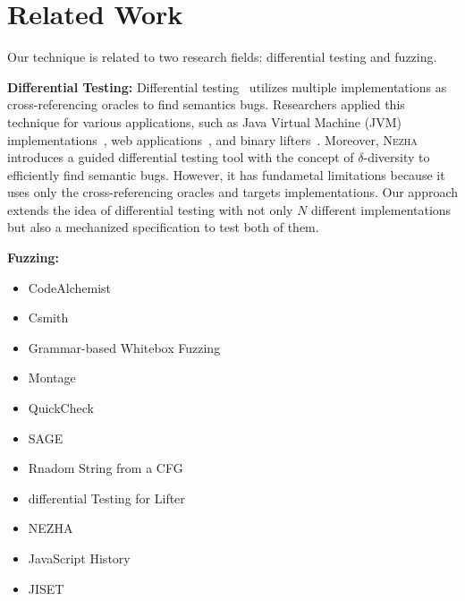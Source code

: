 \section{Related Work}\label{sec:related}

Our technique is related to two research fields: differential testing and
fuzzing.

\textbf{Differential Testing:} Differential testing~\cite{???} utilizes multiple
implementations as cross-referencing oracles to find semantics bugs.
Researchers applied this technique for various applications, such as Java
Virtual Machine (JVM) implementations~\cite{???}, web applications~\cite{???},
and binary lifters~\cite{ir-diff-test}.  Moreover, \textsc{Nezha} introduces a
guided differential testing tool with the concept of $\delta$-diversity to
efficiently find semantic bugs.  However, it has fundametal limitations because
it uses only the cross-referencing oracles and targets implementations.  Our
approach extends the idea of differential testing with not only $N$ different
implementations but also a mechanized specification to test both of them.

\textbf{Fuzzing:} 

\begin{itemize}


  \item CodeAlchemist\cite{codealchemist}
  \item Csmith\cite{csmith}
  \item Grammar-based Whitebox Fuzzing\cite{grammar-whitebox}
  \item Montage\cite{montage}
  \item QuickCheck\cite{quickcheck}
  \item SAGE\cite{sage}
  \item Rnadom String from a CFG\cite{cfg-gen}
  \item differential Testing for Lifter\cite{ir-diff-test}
  \item NEZHA\cite{nezha}
  \item JavaScript History\cite{js-hopl}
  \item JISET\cite{jiset}

\end{itemize}
